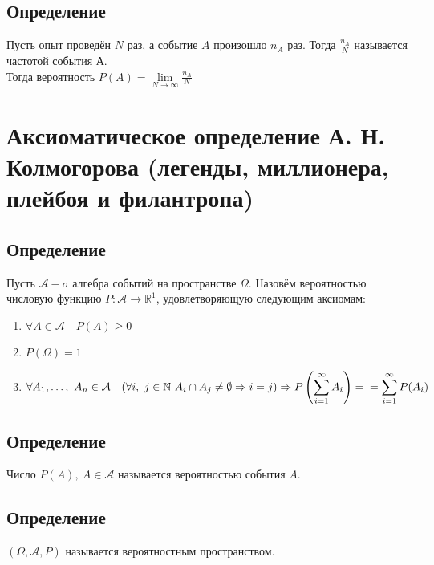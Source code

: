 \documentclass[12pt, a4paper]{article}
\begin{document}
    \subsection*{Определение}
    Пусть опыт проведён $N$ раз, а событие $A$ произошло $n_A$ раз. Тогда $\frac{n_A}{N}$ называется частотой события А.\\
    Тогда вероятность $P(A) = \lim\limits_{N\to\infty} \frac{n_A}{N}$
    \section*{Аксиоматическое определение А. Н. Колмогорова (легенды, миллионера, плейбоя и филантропа)}
    \subsection*{Определение}
    Пусть $\mathcal{A} - \sigma$ алгебра событий на пространстве $\Omega$. Назовём вероятностью числовую функцию $P: \mathcal{A}\to \mathbb{R}^1$, удовлетворяющую следующим аксиомам:
    \begin{enumerate}
        \item $\forall A\in \mathcal{A}\quad P(A) \geq 0$
        \item $P(\Omega) = 1$
        \item $\forall A_1,\dots,\ A_n\in \mathcal{A}\quad (\forall i,\ j\in \mathbb{N}\  A_i\cap A_j \neq \emptyset\Rightarrow i = j)\Rightarrow P\left(\displaystyle \sum_{i = 1}^{\infty}A_i\right) =\\
        = \displaystyle\sum_{i = 1}^{\infty}P(A_i)$
    \end{enumerate}
    \subsection*{Определение}
    Число $P(A),\ A\in \mathcal{A}$ называется вероятностью события $A$.
    \subsection*{Определение}
    $(\Omega, \mathcal{A}, P)$ называется вероятностным пространством.
\end{document}
